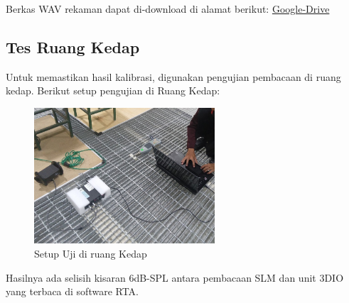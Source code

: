 \documentclass{article}
\begin{document}
	Berkas WAV rekaman dapat di-download di alamat berikut: \href{https://drive.google.com/drive/folders/18bjBI3CSgyAX_4-f_cD2AvmgAtwJ-hkF}{Google-Drive}

	\subsection{Tes Ruang Kedap}

	Untuk memastikan hasil kalibrasi, digunakan pengujian pembacaan di ruang kedap.
	Berikut setup pengujian di Ruang Kedap:

	\begin{figure}[H]
		\centering
		\includegraphics[width=0.6\textwidth,angle=0]{images/tes_kedap}
		\caption{Setup Uji di ruang Kedap}
	\end{figure}

	Hasilnya ada selisih kisaran 6dB-SPL antara pembacaan SLM dan unit 3DIO yang terbaca di software RTA.
\end{document}
